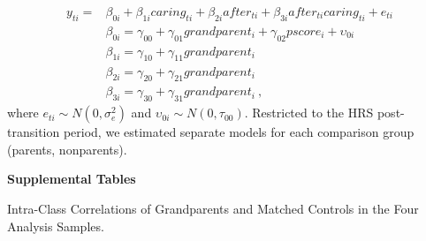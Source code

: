 \documentclass[
  english,
  man, noextraspace,floatsintext]{apa7}
\begin{document}
\begin{appendix}
\begin{equation}
\begin{split}
y_{ti} =& \beta_{0i} + \beta_{1i}caring_{ti} + \beta_{2i}after_{ti} + \beta_{3i}after_{ti}caring_{ti} + e_{ti} \\
& \beta_{0i} = \gamma_{00} + \gamma_{01}grandparent_i + \gamma_{02}pscore_i + \upsilon_{0i} \\
& \beta_{1i} = \gamma_{10} + \gamma_{11}grandparent_i \\
& \beta_{2i} = \gamma_{20} + \gamma_{21}grandparent_i \\
& \beta_{3i} = \gamma_{30} + \gamma_{31}grandparent_i\ ,
\end{split}
\label{eq:mlm4}
\end{equation} where \(e_{ti} \sim N(0, \sigma_e^2)\) and
\(\upsilon_{0i} \sim N(0, \tau_{00})\). Restricted to the HRS
post-transition period, we estimated separate models for each comparison
group (parents, nonparents).

\newpage

\noindent \textbf{Supplemental Tables}

\begin{table}[h]

\begin{center}
\begin{threeparttable}

\caption{\label{tab:icc-table}Intra-Class Correlations of Grandparents and Matched Controls in the Four Analysis Samples.}


\end{threeparttable}
\end{center}
\end{table}
\end{appendix}
\end{document}
